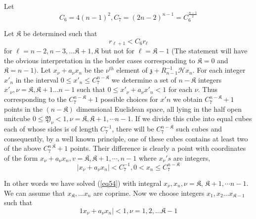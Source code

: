  Let
 \begin{equation*}
 C_6 = 4 (n-1)^2, C_7 = ( 2n - 2 )^{n-1} = C_6^{\frac{n-1}{2}}
 \tag{52}\label{eq52}  
 \end{equation*}
 
 Let $ \mathfrak{K} $ be determined such that 
 \begin{equation*}
r_{\ell+1} < C_6 r_\ell \tag{53}\label{eq53} 
 \end{equation*} 
 for $ \ell = n-2, n-3, \ldots \mathfrak{K} + 1, \mathfrak{K} $ but not
 for $ \ell = \mathfrak{K}-1 $ (The statement will have the obvious
 interpretation in the border cases corresponding to $ \mathfrak{K} = 0
 $ and $ \mathfrak{K} = n-1 ) $. Let $x_\nu + a_\nu x_n $ be the $
 \nu^{th} $ element of $ \mathfrak{z} + R^{-1}_{n-1} \mathscr{H} x_n
 $. For each integer $x'_n $  in the interval $ 0 \leq x'_n \leq C^{n-
   \mathfrak{K}}_7 $ we determine a set of $ n- \mathfrak{K} $ integers
 $ x'_\nu, \nu = \mathfrak{K}, \mathfrak{K} +1 \ldots n-1 $ such that
 $ 0 \leq x'_\nu + a_\nu x'_n < 1 $   for each $ \nu $. Thus
 corresponding to  the  $ C^{n-\mathfrak{K}}_7 + 1 $ possible choices
 for $ x'n $ we obtain $ C^{n-\mathfrak{K}}_7 + 1 $  points in the $
 (n-\mathfrak{K} ) $ dimensional Euclidean space, all lying in the half
 open unit\pageoriginale cube $ 0 \leq \mathfrak{Y}_\nu < 1 ,  \nu =
 \mathfrak{K}, 
 \mathfrak{K} + 1,\cdots n-1 $. If we divide this cube into equal cubes
 each of whose sides is of length $ C^{-1}_7 $, there will be $C^{n
   -\mathfrak{K}}_7 $ such cubes and consequently, by a  well known
 principle, one of  these cubes contains at least two of the above $
 C^{ n \ \mathfrak{K}}_7 +1 $ points. Their difference is clearly a
 point with coordinates of the form $ x_\nu  + a_\nu x_n ,  v =
 \mathfrak{K} ,\mathfrak{K} + 1 , \cdots, n-1 $  where $ x_\nu's$ are
 integers,    
 \begin{equation*}
  \mid x_\nu + a_\nu x_n \mid < C^{-1}_7 ,  0 < x_n \leq C^{n -
    \mathfrak{K}}_7  \tag{54}\label{eq54}  
\end{equation*}

In other words we have solved (\ref{eq54}) with integral $ x_\nu, x_n, \nu =
\mathfrak{K} $, $ \mathfrak{K} + 1, \cdots n-1 $. We can assume that  $
x_\mathfrak{K}, \ldots x_n $  are coprime. Now we choose integers $
x_1, x_2 \ldots x_{\mathfrak{K} -1} $  such that  
\begin{equation*}
 1 x_\nu + a_\nu x_n  \mid < 1, \nu = 1,2, \ldots \mathfrak{K} - 1
 \tag{55}\label{eq55}  
\end{equation*}

